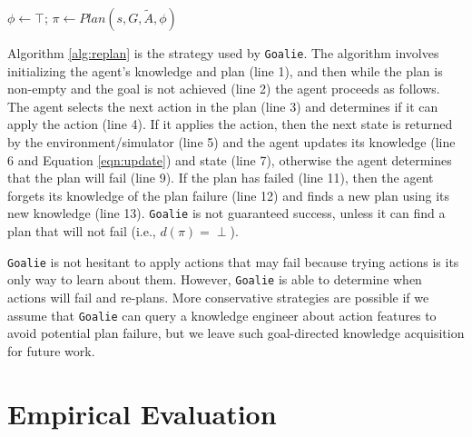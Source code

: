 \documentclass[letterpaper]{article}
\def\goalie{{\tt Goalie}}
\begin{document}
\begin{algorithm}[t]
\SetLine
{}

 $\phi \leftarrow \top$; $\pi \leftarrow Plan(s, G, \tilde{A}, \phi)$\;
\caption{\goalie{}$(s, G, \tilde{A})$}\label{alg:replan}
\end{algorithm}

Algorithm \ref{alg:replan} is the strategy used by \goalie{}.  The algorithm
involves initializing the agent's knowledge and plan (line 1), and then while
the plan is non-empty and the goal is not achieved (line 2) the agent proceeds
as follows.  The agent selects the next action in the plan (line 3) and
determines if it can apply the action (line 4).  If it applies the action, then
the next state is returned by the environment/simulator (line 5) and the agent
updates its knowledge (line 6 and Equation \ref{eqn:update}) and state (line 7),
otherwise the agent determines that the plan will fail (line 9).  If the plan
has failed (line 11), then the agent forgets its knowledge of the plan failure
(line 12) and finds a new plan using its new knowledge (line 13). \goalie{} is
not guaranteed success, unless it can find a plan that will not fail (i.e., 
$d(\pi) = \perp$).

\goalie{} is not hesitant to apply actions that may fail because trying actions
is its only way to learn about them.  However, \goalie{} is able to determine
when actions will fail and re-plans.  More conservative strategies are possible
if we assume that \goalie{} can query a knowledge engineer about action features
to avoid potential plan failure, but we leave such goal-directed knowledge
acquisition for future work.


\section{Empirical Evaluation}\label{sec:empirical}
\end{document}
